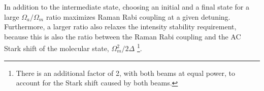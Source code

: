 \documentclass[aps,prl,twocolumn,superscriptaddress]{revtex4-1}
\begin{document}
In addition to the intermediate state,
choosing an initial and a final state for a large $ \Omega_a/\Omega_m $ ratio
maximizes Raman Rabi coupling at a given detuning.
Furthermore, a larger ratio also relaxes the intensity stability requirement,
because this is also the ratio between the Raman Rabi coupling
and the AC Stark shift of the molecular state, $\Omega_m^2 / 2\Delta$
\footnote{There is an additional factor of 2, with both beams at equal power,
  to account for the Stark shift caused by both beams.}.
\end{document}
